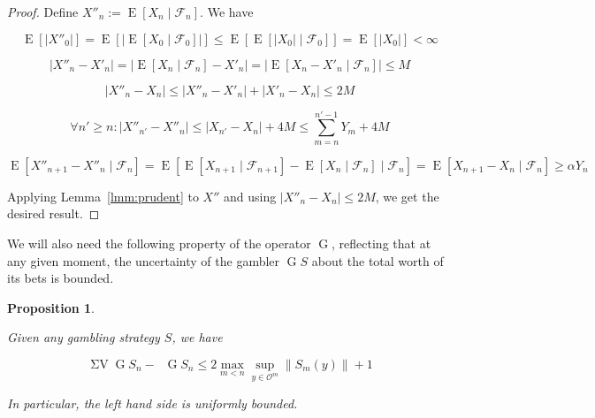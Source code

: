 \documentclass[11pt]{article}
\theoremstyle{definition}
\theoremstyle{plain}
\newtheorem{proposition}{Proposition}%
\newcommand{\A}[1]{\lvert #1 \rvert}
\newcommand{\N}[1]{\lVert #1 \rVert}
\DeclareMathOperator{\E}{E}
\newcommand{\Ob}{\mathcal{O}}
\DeclareMathOperator{\SV}{\Sigma V}
\DeclareMathOperator{\SVM}{\Sigma V_{\min}}
\DeclareMathOperator{\PG}{G}
\newcommand{\F}{\mathcal{F}}
\begin{document}
\begin{proof}

Define ${X''_n:= \E[X_n \mid \F_n]}$. We have

$$\E[\A{X''_0}] = \E[\A{\E[X_0 \mid \F_0]}] \leq \E[\E[\A{X_0} \mid \F_0]] = \E[\A{X_0}] < \infty$$

$$\A{X''_n - X'_n} = \A{\E[X_n \mid \F_n] - X'_n} = \A{\E[X_n - X'_n \mid \F_n]} \leq M$$

$$\A{X''_n - X_n} \leq \A{X''_n - X'_n} + \A{X'_n - X_n} \leq 2M$$

$$\forall n' \geq n: \A{X''_{n'}-X''_n} \leq \A{X_{n'}-X_n} + 4M \leq \sum_{m=n}^{n'-1} Y_m + 4M$$

$$\E[X''_{n+1}-X''_n \mid \F_n] = \E[\E[X_{n+1} \mid \F_{n+1}]-\E[X_n \mid \F_n] \mid \F_n] = \E[X_{n+1}-X_n \mid \F_n] \geq \alpha Y_n$$

Applying Lemma~\ref{lmm:prudent} to $X''$ and using ${\A{X''_n - X_n} \leq 2M}$, we get the desired result.
\end{proof}

We will also need the following property of the operator $\PG$, reflecting that at any given moment, the uncertainty of the gambler $\PG{S}$ about the total worth of its bets is bounded.

\begin{samepage}
\begin{proposition}
\label{prp:pg_bounded_uncertainty}

Given any gambling strategy $S$, we have

\begin{equation}
\SV \PG{S}_n - \SVM \PG{S}_n \leq 2 \max_{m < n} \sup_{y \in \Ob^m} \N{S_m(y)} + 1
\end{equation}

In particular, the left hand side is uniformly bounded.

\end{proposition}
\end{samepage}
\end{document}
